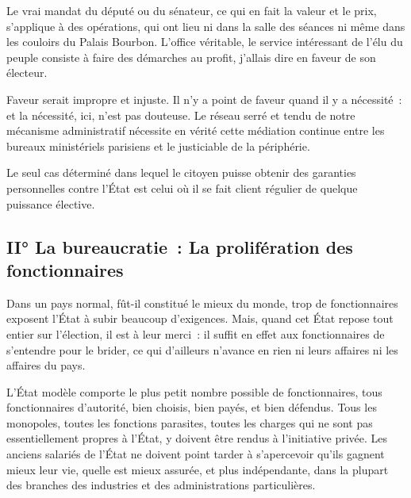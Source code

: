 \documentclass[french,twoside]{book} %
\newcommand{\astermono}{\medskip\centerline{\color{rubric}\large\selectfont{\syms ✻}}\medskip\par}%
\begin{document}
Le vrai mandat du député ou du sénateur, ce qui en fait la valeur et le prix, s’applique à des opérations, qui ont lieu ni dans la salle des séances ni même dans les couloirs du Palais Bourbon. L’office véritable, le service intéressant de l’élu du peuple consiste à faire des démarches au profit, j’allais dire en faveur de son électeur.\par
Faveur serait impropre et injuste. Il n’y a point de faveur quand il y a nécessité : et la nécessité, ici, n’est pas douteuse. Le réseau serré et tendu de notre mécanisme administratif nécessite en vérité cette médiation continue entre les bureaux ministériels parisiens et le justiciable de la périphérie.\par

\astermono

\noindent Le seul cas déterminé dans lequel le citoyen puisse obtenir des garanties personnelles contre l’État est celui où il se fait client régulier de quelque puissance élective.
\subsection[{II° La bureaucratie : La prolifération des fonctionnaires}]{II° La bureaucratie : La prolifération des fonctionnaires}
\noindent Dans un pays normal, fût-il constitué le mieux du monde, trop de fonctionnaires exposent l’État à subir beaucoup d’exigences. Mais, quand cet État repose tout entier sur l’élection, il est à leur merci : il suffit en effet aux fonctionnaires de s’entendre pour le brider, ce qui d’ailleurs n’avance en rien ni leurs affaires ni les affaires du pays.\par
L’État modèle comporte le plus petit nombre possible de fonctionnaires, tous fonctionnaires d’autorité, bien choisis, bien payés, et bien défendus. Tous les monopoles, toutes les fonctions parasites, toutes les charges qui ne sont pas essentiellement propres à l’État, y doivent être rendus à l’initiative privée. Les anciens salariés de l’État ne doivent point tarder à s’apercevoir qu’ils gagnent mieux leur vie, quelle est mieux assurée, et plus indépendante, dans la plupart des branches des industries et des administrations particulières.\par

\astermono
\end{document}
